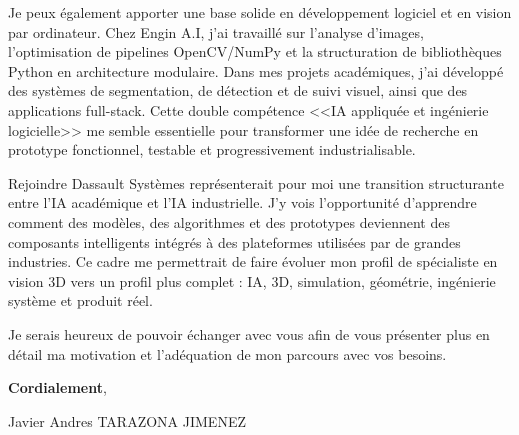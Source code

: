 \documentclass[10pt,a4paper]{article}
\begin{document}
{Je peux également apporter une base solide en développement logiciel et en vision par ordinateur. Chez Engin A.I, j’ai travaillé sur l’analyse d’images, l’optimisation de pipelines OpenCV/NumPy et la structuration de bibliothèques Python en architecture modulaire. Dans mes projets académiques, j’ai développé des systèmes de segmentation, de détection et de suivi visuel, ainsi que des applications full-stack. Cette double compétence <<IA appliquée et ingénierie logicielle>> me semble essentielle pour transformer une idée de recherche en prototype fonctionnel, testable et progressivement industrialisable.

Rejoindre Dassault Systèmes représenterait pour moi une transition structurante entre l’IA académique et l’IA industrielle. J’y vois l’opportunité d’apprendre comment des modèles, des algorithmes et des prototypes deviennent des composants intelligents intégrés à des plateformes utilisées par de grandes industries. Ce cadre me permettrait de faire évoluer mon profil de spécialiste en vision 3D vers un profil plus complet : IA, 3D, simulation, géométrie, ingénierie système et produit réel.

Je serais heureux de pouvoir échanger avec vous afin de vous présenter plus en détail ma motivation et l’adéquation de mon parcours avec vos besoins.

\textbf{Cordialement},

Javier Andres TARAZONA JIMENEZ


}
\end{document}

